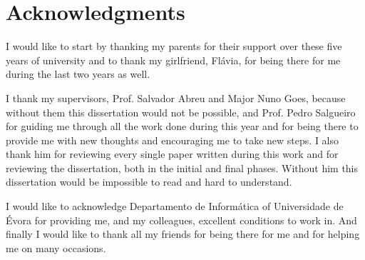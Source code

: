 \chapter*{Acknowledgments}

I would like to start by thanking my parents for their support over these five years of university and to thank my girlfriend, Flávia, for being there for me during the last two years as well.

I thank my supervisors, Prof. Salvador Abreu and Major Nuno Goes, because without them this dissertation would not be possible, and Prof. Pedro Salgueiro for guiding me through all the work done during this year and for being there to provide me with new thoughts and encouraging me to take new steps. I also thank him for reviewing every single paper written during this work and for reviewing the dissertation, both in the initial and final phases. Without him this dissertation would be impossible to read and hard to understand.

I would like to acknowledge Departamento de Informática of Universidade de Évora for providing me, and my colleagues, excellent conditions to work in. And finally I would like to thank all my friends for being there for me and for helping me on many occasions.